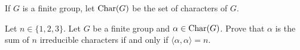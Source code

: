 If $G$ is a finite group, let $\operatorname{Char}(G)$
be the set of characters of $G$. 

\begin{exercise}
    Let $n\in\{1,2,3\}$. Let $G$ be a finite
    group and $\alpha\in\operatorname{Char}(G)$. Prove that
    $\alpha$ is the sum
    of $n$ irreducible characters if and only if $\langle\alpha,\alpha\rangle=n$.  
\end{exercise}